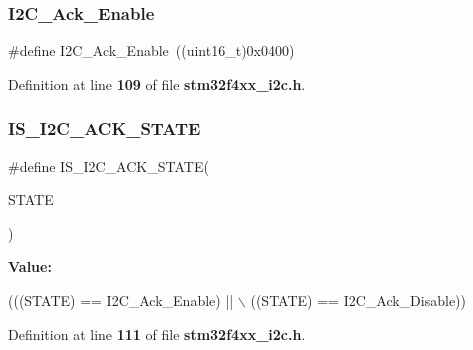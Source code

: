 \subsubsection{I2\+C\+\_\+\+Ack\+\_\+\+Enable}
{\footnotesize\ttfamily \#define I2\+C\+\_\+\+Ack\+\_\+\+Enable~((uint16\+\_\+t)0x0400)}



Definition at line \textbf{ 109} of file \textbf{ stm32f4xx\+\_\+i2c.\+h}.

\mbox{\label{group__I2C__acknowledgement_ga6401bedc842e784a2bb78b3aa21af19d}} 
\subsubsection{I\+S\+\_\+\+I2\+C\+\_\+\+A\+C\+K\+\_\+\+S\+T\+A\+TE}
{\footnotesize\ttfamily \#define I\+S\+\_\+\+I2\+C\+\_\+\+A\+C\+K\+\_\+\+S\+T\+A\+TE(\begin{DoxyParamCaption}\item[{}]{S\+T\+A\+TE }\end{DoxyParamCaption})}

{\bfseries Value\+:}
\begin{DoxyCode}
(((STATE) == I2C_Ack_Enable) || \(\backslash\)
                                 ((STATE) == I2C_Ack_Disable))
\end{DoxyCode}


Definition at line \textbf{ 111} of file \textbf{ stm32f4xx\+\_\+i2c.\+h}.

